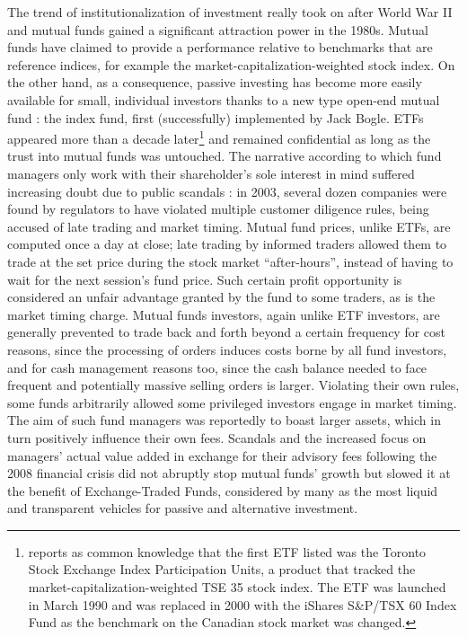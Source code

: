 The trend of institutionalization of investment really took on after World War II and mutual funds gained a significant attraction power in the 1980s. Mutual funds have claimed to provide a performance relative to benchmarks that are reference indices, for example the market-capitalization-weighted stock index. On the other hand, as a consequence, passive investing has become more easily available for small, individual investors thanks to a new type open-end mutual fund : the index fund, first (successfully) implemented by Jack Bogle. ETFs appeared more than a decade later\footnote{\textcite{Charupat2013} reports as common knowledge that the first ETF listed was the Toronto Stock Exchange Index Participation Units, a product that tracked the market-capitalization-weighted TSE 35 stock index. The ETF was launched in March 1990 and was replaced in 2000 with the iShares S\&P/TSX 60 Index Fund as the benchmark on the Canadian stock market was changed.} and remained confidential as long as the trust into mutual funds was untouched. The narrative according to which fund managers only work with their shareholder's sole interest in mind suffered increasing doubt due to public scandals : in 2003, several dozen companies were found by regulators to have violated multiple customer diligence rules, being accused of late trading and market timing. Mutual fund prices, unlike ETFs, are computed once a day at close; late trading by informed traders allowed them to trade at the set price during the stock market ``after-hours'', instead of having to wait for the next session's fund price. Such certain profit opportunity is considered an unfair advantage granted by the fund to some traders, as is the market timing charge. Mutual funds investors, again unlike ETF investors, are generally prevented to trade back and forth beyond a certain frequency for cost reasons, since the processing of orders induces costs borne by all fund investors, and for cash management reasons too, since the cash balance needed to face frequent and potentially massive selling orders is larger. Violating their own rules, some funds arbitrarily allowed some privileged investors engage in market timing. The aim of such fund managers was reportedly to boast larger assets, which in turn positively influence their own fees. Scandals and the increased focus on managers' actual value added in exchange for their advisory fees following the 2008 financial crisis did not abruptly stop mutual funds' growth but slowed it at the benefit of Exchange-Traded Funds, considered by many as the most liquid and transparent vehicles for passive and alternative investment.

